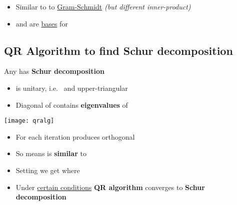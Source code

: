 \begin{itemize}
            \begin{itemize}

                  \item
                        Similar to to \underline{Gram-Schmidt} \emph{(but different inner-product)}
                  \item
                         and
                        are \underline{bases} for 
            \end{itemize}
\end{itemize}


\subsection*{\texorpdfstring{QR Algorithm to find Schur decomposition
            }{QR Algorithm to find Schur decomposition }}


Any  has 
\textbf{Schur decomposition} 
\begin{itemize}

      \item
             is unitary, i.e.~ and
            upper-triangular 
      \item
            Diagonal of  contains \textbf{eigenvalues} of 
\end{itemize}

\hSep %

\texttt{[image: qralg]}

\begin{itemize}

      \item For  each iteration
             produces orthogonal

      \item So 
            means  is \textbf{similar} to 

      \item Setting  we get
             where
      
      \item Under \underline{certain conditions} \textbf{QR algorithm} converges to
            \textbf{Schur decomposition}
\end{itemize}

